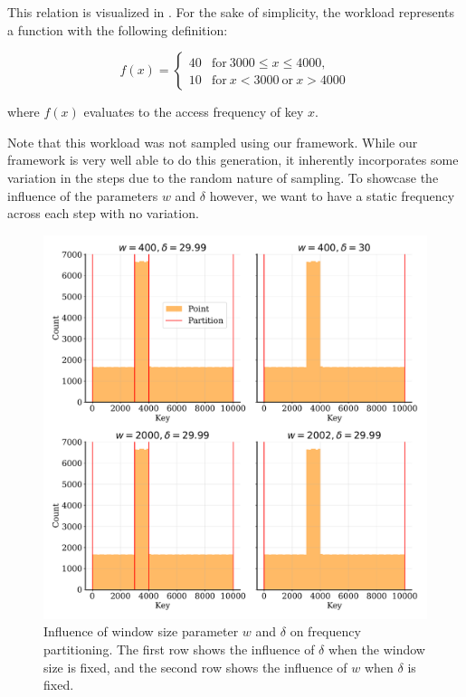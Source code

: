 \noindent This relation is visualized in . For the sake of simplicity, the workload represents a function with the following definition:

$$
f(x)=\begin{cases}
  40 & \mathrm{for}\ 3000 \leq x \leq 4000, \\[8pt]
  10 & \mathrm{for}\ x<3000\ \mathrm{or}\ x>4000
  \end{cases}
$$

\noindent where $f(x)$ evaluates to the access frequency of key $x$.

\noindent Note that this workload was not sampled using our framework. While our framework is very well able to do this generation, it inherently incorporates some variation in the steps due to the random nature of sampling. To showcase the influence of the parameters $w$ and $\delta$ however, we want to have a static frequency across each step with no variation.

\begin{figure}
    \centering
    \includegraphics[width=\textwidth]{figures/freq_influence.pdf}
    \caption[Influence of frequency hyperparameters]{Influence of window size parameter $w$ and $\delta$ on frequency partitioning. The first row shows the influence of $\delta$ when the window size is fixed, and the second row shows the influence of $w$ when $\delta$ is fixed.}
    \label{fig:freqinfluence}
\end{figure}

